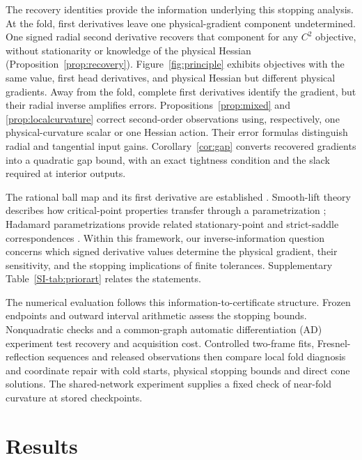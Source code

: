 \documentclass[10pt,a4paper]{article}
\begin{document}
The recovery identities provide the information underlying this stopping analysis. At the fold, first derivatives leave one physical-gradient component undetermined. One signed radial second derivative recovers that component for any $C^2$ objective, without stationarity or knowledge of the physical Hessian (Proposition~\ref{prop:recovery}). Figure~\ref{fig:principle} exhibits objectives with the same value, first head derivatives, and physical Hessian but different physical gradients. Away from the fold, complete first derivatives identify the gradient, but their radial inverse amplifies errors. Propositions~\ref{prop:mixed} and \ref{prop:localcurvature} correct second-order observations using, respectively, one physical-curvature scalar or one Hessian action. Their error formulas distinguish radial and tangential input gains. Corollary~\ref{cor:gap} converts recovered gradients into a quadratic gap bound, with an exact tightness condition and the slack required at interior outputs.

The rational ball map and its first derivative are established \cite[Sec.~V-B, (78)--(79)]{gcopter}. Smooth-lift theory describes how critical-point properties transfer through a parametrization \cite{lifts}; Hadamard parametrizations provide related stationary-point and strict-saddle correspondences \cite{hadamard}. Within this framework, our inverse-information question concerns which signed derivative values determine the physical gradient, their sensitivity, and the stopping implications of finite tolerances. Supplementary Table~\ref{SI-tab:priorart} relates the statements.

The numerical evaluation follows this information-to-certificate structure. Frozen endpoints and outward interval arithmetic assess the stopping bounds. Nonquadratic checks and a common-graph automatic differentiation (AD) experiment test recovery and acquisition cost. Controlled two-frame fits, Fresnel-reflection sequences and released observations then compare local fold diagnosis and coordinate repair with cold starts, physical stopping bounds and direct cone solutions. The shared-network experiment supplies a fixed check of near-fold curvature at stored checkpoints.


\section{Results}
\label{sec:results}
\end{document}
